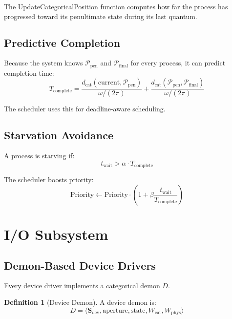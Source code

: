 \documentclass[twocolumn,10pt]{article}
\theoremstyle{definition}
\newtheorem{definition}[theorem]{Definition}
\theoremstyle{remark}
\newcommand{\pentstate}{\mathcal{P}_{\text{pen}}}
\newcommand{\finalstate}{\mathcal{P}_{\text{final}}}
\newcommand{\Scoord}{\mathbf{S}}
\newcommand{\dcat}{d_{\text{cat}}}
\begin{document}
The UpdateCategoricalPosition function computes how far the process has progressed toward its penultimate state during its last quantum.

\subsection{Predictive Completion}

Because the system knows $\pentstate$ and $\finalstate$ for every process, it can predict completion time:
\begin{equation}
    T_{\text{complete}} = \frac{\dcat(\text{current}, \pentstate)}{\omega / (2\pi)} + \frac{\dcat(\pentstate, \finalstate)}{\omega / (2\pi)}
\end{equation}

The scheduler uses this for deadline-aware scheduling.

\subsection{Starvation Avoidance}

A process is starving if:
\begin{equation}
    t_{\text{wait}} > \alpha \cdot T_{\text{complete}}
\end{equation}

The scheduler boosts priority:
\begin{equation}
    \text{Priority} \gets \text{Priority} \cdot \left(1 + \beta \frac{t_{\text{wait}}}{T_{\text{complete}}}\right)
\end{equation}

\section{I/O Subsystem}
\label{sec:io}

\subsection{Demon-Based Device Drivers}

Every device driver implements a categorical demon $D$.

\begin{definition}[Device Demon]
A device demon is:
\begin{equation}
    D = \langle \Scoord_{\text{dev}}, \text{aperture}, \text{state}, W_{\text{cat}}, W_{\text{phys}} \rangle
\end{equation}
\end{definition}
\end{document}
